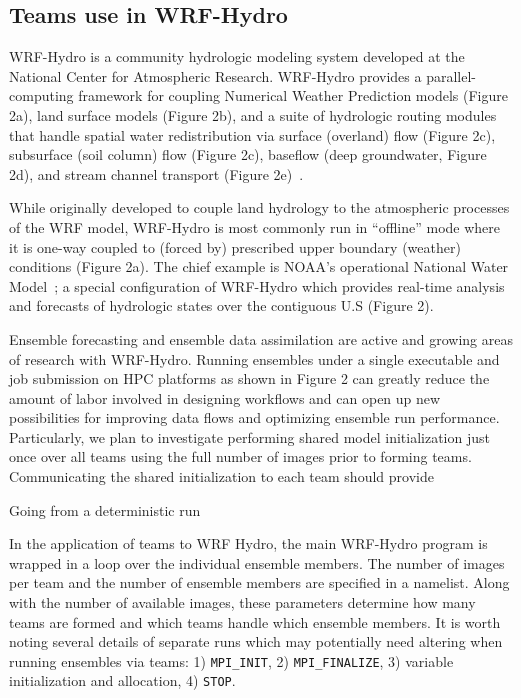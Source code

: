 \subsection{Teams use in WRF-Hydro}

WRF-Hydro is a community hydrologic modeling system developed at the
National Center for Atmospheric Research.  WRF-Hydro provides a
parallel-computing framework for coupling Numerical Weather Prediction
models (Figure 2a), land surface models (Figure 2b), and a suite of hydrologic routing modules that handle
spatial water redistribution via surface (overland) flow (Figure 2c),
subsurface (soil column) flow (Figure 2c), baseflow (deep groundwater,
Figure 2d), and stream
channel transport (Figure 2e)~\cite{gochisEtal}.

While originally developed to couple land hydrology to the atmospheric processes of
the WRF model, WRF-Hydro is most commonly run in ``offline'' mode where it is one-way
coupled to (forced by) prescribed upper boundary (weather)
conditions (Figure 2a). The chief example is NOAA's operational
National Water Model~\cite{noaa2016}; a special configuration of
WRF-Hydro which provides real-time analysis and forecasts of
hydrologic states over the contiguous U.S (Figure 2).

Ensemble forecasting and ensemble data assimilation are active and
growing areas of research with WRF-Hydro. Running ensembles under a
single executable and job submission on HPC platforms as shown in
Figure 2 can greatly reduce the amount
of labor involved in designing workflows and can open up new
possibilities for improving data flows and optimizing ensemble run
performance. Particularly, we plan to investigate performing shared model
initialization just once over all teams using the full number of
images prior to forming teams. Communicating the shared initialization
to each team should provide 

Going from a deterministic run


In the application of teams to WRF Hydro, the main WRF-Hydro program is wrapped in a loop
over the individual ensemble members. The number of images per team and the
 number of ensemble members are specified in a namelist. Along with
 the number of available images, these parameters determine how many
 teams are formed and which teams handle which ensemble members. It is
 worth noting several details of separate runs which may potentially need altering
 when running ensembles via teams: 1) \texttt{MPI\_INIT}, 2) \texttt{MPI\_FINALIZE}, 3)
 variable initialization and allocation, 4) \texttt{STOP}.   

